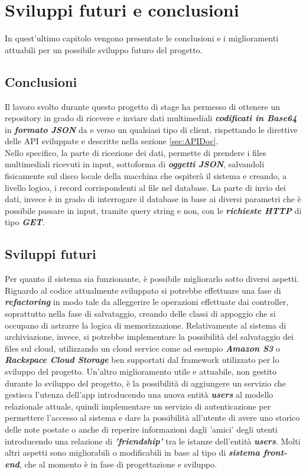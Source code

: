 \chapter{Sviluppi futuri e conclusioni}
In quest'ultimo capitolo vengono presentate le conclusioni e i miglioramenti attuabili per un possibile sviluppo futuro del progetto.

\section{Conclusioni}
Il lavoro svolto durante questo progetto di stage ha permesso di ottenere un repository in grado di ricevere e inviare dati multimediali \textit{\textbf{codificati in Base64}} in \textit{\textbf{formato JSON}} da e verso un qualsiasi tipo di client, rispettando le direttive delle API sviluppate e descritte nella sezione \ref{sec:APIDoc}. \\
Nello specifico, la parte di ricezione dei dati, permette di prendere i files multimediali ricevuti in input, sottoforma di \textit{\textbf{oggetti JSON}}, salvandoli fisicamente sul disco locale della macchina che ospiterà il sistema e creando, a livello logico, i record corrispondenti al file nel database.
La parte di invio dei dati, invece è in grado di interrogare il database in base ai diversi parametri che è possibile passare in input, tramite query string e non, con le \textit{\textbf{richieste HTTP}} di tipo \textit{\textbf{GET}}.

\section{Sviluppi futuri}
Per quanto il sistema sia funzionante, è possibile migliorarlo sotto diversi aspetti.
Riguardo al codice attualmente sviluppato si potrebbe effettuare una fase di \textit{\textbf{refactoring}} in modo tale da alleggerire le operazioni effettuate dai controller, soprattutto nella fase di salvataggio, creando delle classi di appoggio che si occupano di astrarre la logica di memorizzazione.
Relativamente al sistema di archiviazione, invece, si potrebbe implementare la possibilità del salvataggio dei files sul cloud, utilizzando un cloud service come ad esempio \textit{\textbf{Amazon S3}} o \textit{\textbf{Rackspace Cloud Storage}} ben supportati dal framework utilizzato per lo sviluppo del progetto.
Un'altro miglioramento utile e attuabile, non gestito durante lo sviluppo del progetto, è la possibilità di aggiungere un servizio che gestisca l'utenza dell'app introducendo una nuova entità \textit{\textbf{users}} al modello relazionale attuale, quindi implementare un servizio di autenticazione per permettere l'accesso al sistema e dare la possibilità all'utente di avere uno storico delle note postate o anche di reperire informazioni dagli 'amici' degli utenti introducendo una relazione di \textit{\textbf{'friendship'}} tra le istanze dell'entità \textit{\textbf{users}}.
Molti altri aspetti sono migliorabili o modificabili in base al tipo di \textit{\textbf{sistema front-end}}, che al momento è in fase di progettazione e sviluppo.

